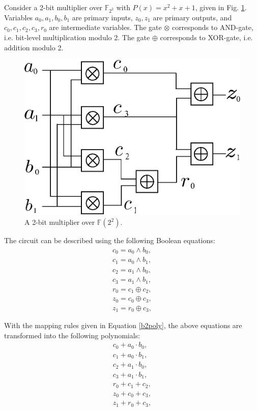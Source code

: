 \begin{Example}
\label{exp:mul2bit}
Consider a 2-bit multiplier over ${\mathbb{F}}_{2^2}$ with
$P(x)=x^{2}+x+1$, given in Fig. \ref{fig:2bitmul}. Variables $a_0,
a_1, b_0, b_1$ are primary inputs, $z_0, z_1$ are primary outputs, and
$c_0, c_1, c_2, c_3, r_0$ are intermediate variables. The gate $\otimes$
corresponds to AND-gate, i.e. bit-level multiplication modulo 2. The
gate $\oplus$ corresponds to XOR-gate, i.e. addition modulo 2.

\begin{figure}[b]
\centerline{
\includegraphics[scale=0.5]{./figures/2bitmultiplier.eps}
}
\caption{ A 2-bit multiplier over ${\mathbb{F}}(2^2)$.}
\label{fig:2bitmul}
\end{figure}

The circuit can be described using the following Boolean equations:
\begin{align*}
c_0=a_0 \wedge b_0,   \nonumber \\
c_1=a_0 \wedge b_1,   \nonumber \\
c_2=a_1 \wedge b_0, \nonumber \\
c_3=a_1 \wedge b_1,   \nonumber \\
r_0=c_1 \oplus c_2 ,      \nonumber \\
z_0=c_0 \oplus c_3,   \nonumber \\
z_1=r_0 \oplus c_3,    \nonumber
\end{align*}

With the mapping rules given in Equation \ref{b2poly}, 
the above equations are transformed into the following polynomials:
\begin{align*}
c_0+a_0 \cdot b_0,   \nonumber \\
c_1+a_0 \cdot b_1,   \nonumber \\
c_2+a_1 \cdot b_0,   \nonumber \\
c_3+a_1 \cdot b_1,   \nonumber \\
r_0+c_1 + c_2 ,      \nonumber \\
z_0+c_0 + c_3,   \nonumber \\
z_1+r_0 + c_3,   \nonumber
\end{align*}


\end{Example}
